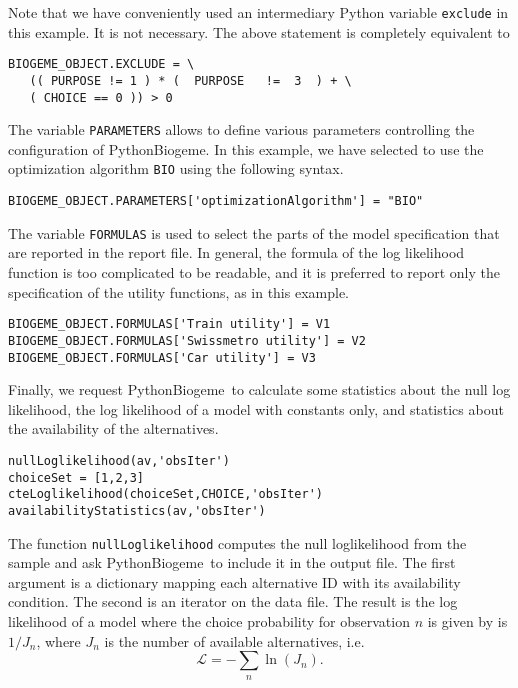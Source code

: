 \documentclass[12pt,a4paper]{article}
\newcommand{\PBIOGEME}{PythonBiogeme}
\begin{document}
Note that we have conveniently used an intermediary Python variable
\lstinline+exclude+ in this example. It is not necessary. The above
statement is completely equivalent to 
\begin{lstlisting}[style=nonumbers]
BIOGEME_OBJECT.EXCLUDE = \
   (( PURPOSE != 1 ) * (  PURPOSE   !=  3  ) + \
   ( CHOICE == 0 )) > 0
\end{lstlisting}

The variable \lstinline+PARAMETERS+ allows to define various
parameters controlling the configuration of \PBIOGEME. In this
example, we have selected to use the optimization algorithm
\lstinline+BIO+ using the following syntax.
\begin{lstlisting}[style=nonumbers]
BIOGEME_OBJECT.PARAMETERS['optimizationAlgorithm'] = "BIO"
\end{lstlisting}

The variable \lstinline+FORMULAS+ is used to select the parts of the
model specification that are reported in the report file. In general,
the formula of the log likelihood function is too complicated to be
readable, and it is preferred to report only the specification of the
utility functions, as in this example.
\begin{lstlisting}[style=nonumbers]
BIOGEME_OBJECT.FORMULAS['Train utility'] = V1
BIOGEME_OBJECT.FORMULAS['Swissmetro utility'] = V2
BIOGEME_OBJECT.FORMULAS['Car utility'] = V3
\end{lstlisting}

Finally, we request \PBIOGEME\ to calculate some statistics about the
null log likelihood, the log likelihood of a model with constants
only, and statistics about the availability of the alternatives. 

\begin{lstlisting}[style=nonumbers]
nullLoglikelihood(av,'obsIter')
choiceSet = [1,2,3]
cteLoglikelihood(choiceSet,CHOICE,'obsIter')
availabilityStatistics(av,'obsIter')
\end{lstlisting}

The function \lstinline+nullLoglikelihood+ computes the null loglikelihood from the sample and ask \PBIOGEME\ to include it in the output file.
The first argument is a dictionary  mapping each alternative ID with
its availability condition. The second is an iterator on the data file.
The result is the log likelihood of a model where the choice probability for
 observation $n$ is given by is $1/J_n$, where $J_n$ is
 the number of available alternatives, i.e. 
\begin{equation}
 \mathcal{L} = -\sum_n \ln(J_n).
\end{equation}
\end{document}
